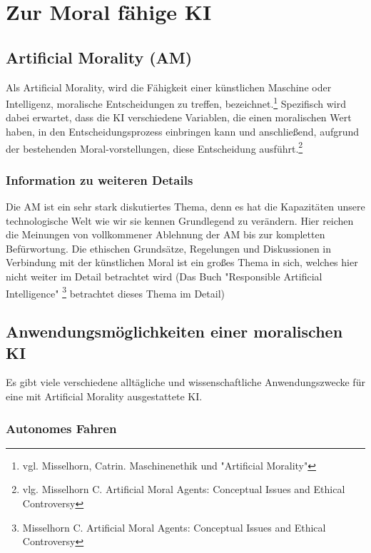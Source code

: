 \section{Zur Moral fähige KI}\label{sec::moralische KI}

\subsection{Artificial Morality (AM)}\label{subsec::artificial morality}

Als Artificial Morality, wird die Fähigkeit einer künstlichen Maschine oder Intelligenz, moralische Entscheidungen zu
treffen, bezeichnet.\footnote{vgl. Misselhorn, Catrin. Maschinenethik und "Artificial Morality"} Spezifisch
wird dabei erwartet, dass die KI verschiedene Variablen, die einen moralischen Wert haben, in den Entscheidungsprozess
einbringen kann und anschließend, aufgrund der bestehenden Moral-vorstellungen, diese Entscheidung ausführt.\footnote{vlg. Misselhorn C. Artificial Moral Agents: Conceptual Issues and Ethical Controversy}

\subsubsection{Information zu weiteren Details}

Die AM ist ein sehr stark diskutiertes Thema, denn es hat die Kapazitäten unsere technologische Welt wie wir sie kennen
Grundlegend zu verändern.
Hier reichen die Meinungen von vollkommener Ablehnung der AM bis zur kompletten Befürwortung.
Die ethischen Grundsätze, Regelungen und Diskussionen in Verbindung mit der künstlichen Moral ist ein großes Thema
in sich, welches hier nicht weiter im Detail betrachtet wird (Das Buch "Responsible Artificial Intelligence"
\footnote{Misselhorn C. Artificial Moral Agents: Conceptual Issues and Ethical Controversy} betrachtet dieses Thema im Detail)

\subsection{Anwendungsmöglichkeiten einer moralischen KI}\label{subsec::anwendungen}

Es gibt viele verschiedene alltägliche und wissenschaftliche Anwendungszwecke für eine mit Artificial Morality ausgestattete KI\@.

\subsubsection{Autonomes Fahren}\label{subsubsec::autonomes fahren}

